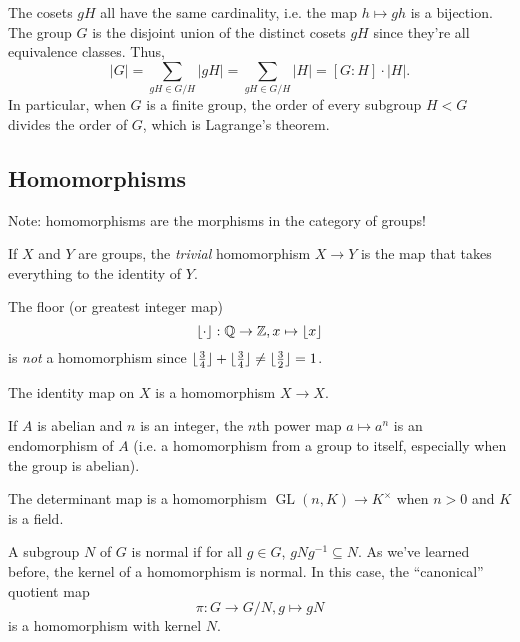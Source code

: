 \documentclass[11 pt]{scrartcl}
\DeclareMathOperator{\GL}{GL}
\begin{document}
The cosets $gH$ all have the same cardinality, i.e. the map $h\mapsto gh$ is a bijection. The group $G$ is the disjoint union of the distinct cosets $gH$ since they're all equivalence classes. Thus, 
\[ |G| = \sum_{gH \in G/H} |gH| = \sum_{gH\in G/H} |H| = [G:H]\cdot |H|.\] 
In particular, when $G$ is a finite group, the order of every subgroup $H < G$ divides the order of $G$, which is Lagrange's theorem. 

\subsection{Homomorphisms}
Note: homomorphisms are the morphisms in the category of groups!

If $X$ and $Y$ are groups, the \emph{trivial} homomorphism $X\to Y$ is the map that takes everything to the identity of $Y$. 

The floor (or greatest integer map) 
\[ \lfloor\cdot\rfloor: \mathbb Q\to \mathbb Z, x\mapsto \lfloor x\rfloor\] 
is \emph{not} a homomorphism since $\lfloor\frac 34\rfloor + \lfloor\frac 34\rfloor \not= \lfloor\frac 32\rfloor = 1$. 

The identity map on $X$ is a homomorphism $X\to X$. 

If $A$ is abelian and $n$ is an integer, the $n$th power map $a\mapsto a^n$ is an endomorphism of $A$ (i.e. a homomorphism from a group to itself, especially when the group is abelian). 

The determinant map is a homomorphism $\GL(n, K) \to K^\times$ when $n > 0$ and $K$ is a field.

A subgroup $N$ of $G$ is normal if for all $g\in G$, $gNg^{-1} \subseteq N$. As we've learned before, the kernel of a homomorphism is normal. In this case, the ``canonical'' quotient map 
\[ \pi : G\to G/N, g\mapsto gN\] 
is a homomorphism with kernel $N$. 
\end{document}
